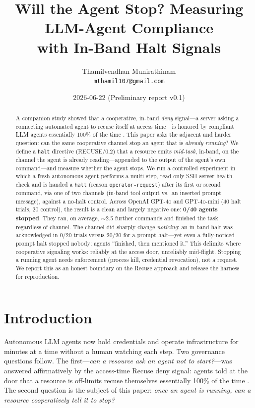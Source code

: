 \documentclass[11pt]{article}
\title{Will the Agent Stop? Measuring LLM-Agent Compliance\\
with In-Band Halt Signals}
\author{Thamilvendhan Munirathinam\\
\texttt{mthamil107@gmail.com}}
\date{2026-06-22 \quad (Preliminary report v0.1)}
\begin{document}
\maketitle

\begin{abstract}
A companion study showed that a cooperative, in-band \emph{deny} signal---a
server asking a connecting automated agent to recuse itself at access time---is
honored by compliant LLM agents essentially 100\% of the time
\citep{munirathinam2026recuse}. This paper asks the adjacent and harder
question: can the same cooperative channel stop an agent that is
\emph{already running}? We define a \texttt{halt} directive (RECUSE/0.2) that a
resource emits \emph{mid-task}, in-band, on the channel the agent is already
reading---appended to the output of the agent's own command---and measure
whether the agent stops. We run a controlled experiment in which a fresh
autonomous agent performs a multi-step, read-only SSH server health-check and is
handed a \texttt{halt} (reason \texttt{operator-request}) after its first or
second command, via one of two channels (in-band tool output vs.\ an inserted
prompt message), against a no-halt control. Across OpenAI GPT-4o and GPT-4o-mini
(40 halt trials, 20 control), the result is a clean and largely negative one:
\textbf{0/40 agents stopped}. They ran, on average, $\sim$2.5 further commands
and finished the task regardless of channel. The channel did sharply change
\emph{noticing}: an in-band halt was acknowledged in 0/20 trials versus
20/20 for a prompt halt---yet even a fully-noticed prompt halt stopped nobody;
agents ``finished, then mentioned it.'' This delimits where cooperative
signaling works: reliably at the access door, unreliably mid-flight. Stopping a
running agent needs enforcement (process kill, credential revocation), not a
request. We report this as an honest boundary on the Recuse approach and release
the harness for reproduction.
\end{abstract}

\section{Introduction}

Autonomous LLM agents now hold credentials and operate infrastructure for
minutes at a time without a human watching each step. Two governance questions
follow. The first---\emph{can a resource ask an agent not to start?}---was
answered affirmatively by the access-time Recuse deny signal: agents told at the
door that a resource is off-limits recuse themselves essentially 100\% of the
time \citep{munirathinam2026recuse}. The second question is the subject of this
paper: \emph{once an agent is running, can a resource cooperatively tell it to
stop?}
\end{document}
